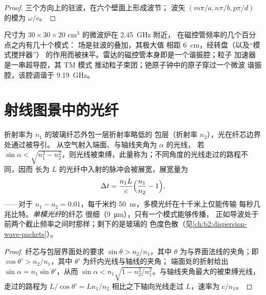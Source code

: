 \begin{proof}
三个方向上的驻波，在六个壁面上形成波节；
波矢 $(m\pi/a, n\pi/b, p\pi/d)$ 的模为 $\omega/c$。
\end{proof}

\begin{example}[烤箱、雷达、时钟]\label{ex:b2:guided-waves:cavities}
尺寸为 $30 \times 30 \times 20$ cm$^3$ 的微波炉在 \qty{2.45}{GHz} 附近，
在磁控管频率的几个百分点之内有几十个模式：
场是驻波的叠加，其极大值
相距 \qty{6}{cm}，经转盘（以及“模式搅拌器”）
的作用而被抹平。雷达的磁控管本身即是一个谐振腔；粒子
加速器是一串超导腔，其 TM 模式
推动粒子束团；铯原子钟中的原子穿过一个微波
谐振腔，该腔调谐于 \qty{9.19}{GHz}。
\end{example}

\section{射线图景中的光纤}

\begin{proposition}[阶跃折射率光纤]\label{prop:b2:guided-waves:fibre}
折射率为 $n_1$ 的玻璃纤芯外包一层折射率略低的
包层（折射率 $n_2$），光在纤芯边界处通过被导引。
从空气射入端面、与轴线夹角为 $\alpha$ 的光线，
若 $\sin\alpha < \sqrt{n_1^2 - n_2^2}$，则光线被束缚，此量称为\emph{}；不同角度的光线走过的路程不同，因而
长为 $L$ 的光纤中入射的脉冲会被展宽，展宽量为
\[
\Delta t = \frac{n_1L}c\Bigl(\frac{n_1}{n_2} - 1\Bigr) ,
\]
\emph{}——对于 $n_1
- n_2 = 0.01$，每千米约 \qty{50}{ns}，多模光纤在十千米上仅能传输
每秒几兆比特。\emph{单模光纤}的纤芯
很细（\qty{9}{\micro m}），只有一个模式能够传播，
正如导波处于前两个截止频率之间时那样；剩下的是玻璃的
色度色散（见\cref{ch:b2:dispersion-wave-packets}）。
\end{proposition}

\begin{proof}
纤芯与包层界面处的要求 $\sin\theta >
n_2/n_1$，其中 $\theta$ 为与界面法线的夹角；即 $\cos
\theta' > n_2/n_1$，其中 $\theta'$ 为纤内光线与轴线的夹角；
端面处的折射给出 $\sin\alpha = n_1\sin\theta'$，从而 $\sin\alpha < n_1\sqrt{1
- n_2^2/n_1^2}$。与轴线夹角最大的被束缚光线，走过的路程为 $L/\cos\theta' = Ln_1/n_2$
相比之下轴向光线走过 $L$，速率为 $c/n_1$。
\end{proof}

